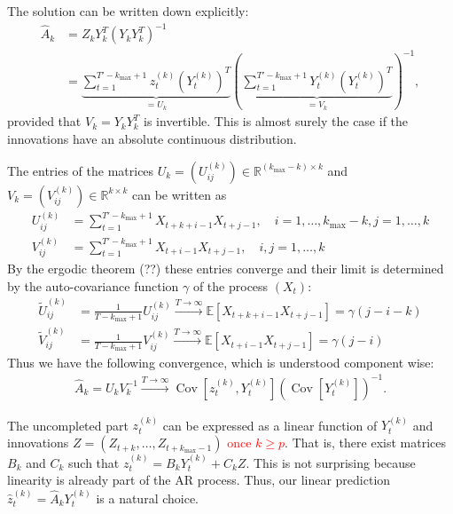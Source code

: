 The solution can be written down explicitly:
\begin{align*}
    \hat{A}_k&=Z_kY_k^{T}\left(Y_kY_k^{T}\right)^{-1}\\&
    =\underbrace{\sum_{t=1}^{T'-k_{\max}+1}z_t^{(k)}\left(Y_t^{(k)}\right)^T}_{=U_k}\left(\underbrace{\sum_{t=1}^{T'-k_{\max}+1}Y_t^{(k)}\left(Y_t^{(k)}\right)^{T}}_{=V_k}\right)^{-1},
\end{align*}
provided that $V_k=Y_kY_k^{T}$ is invertible. This is almost surely the case if the innovations have an absolute continuous distribution.


The entries of the matrices $U_k=(U_{ij}^{(k)})\in\mathbb{R}^{(k_{\max}-k)\times k}$ and $V_k=(V_{ij}^{(k)})\in\mathbb{R}^{k\times k}$ can be written as
\begin{align*}
    U_{ij}^{(k)}&=\sum_{t=1}^{T'-k_{\max}+1}X_{t+k+i-1}X_{t+j-1},\quad i=1,\dots,k_{\max}-k,j=1,\dots,k\\
    V_{ij}^{(k)}&=\sum_{t=1}^{T'-k_{\max}+1}X_{t+i-1}X_{t+j-1},\quad i,j=1,\dots,k
\end{align*}
By the ergodic theorem (??) these entries converge and their limit is determined by the auto-covariance function $\gamma$ of the process $(X_t)$:
\begin{align*}
    \tilde{U}_{ij}^{(k)}&=\frac{1}{T-k_{\max}+1}U_{ij}^{(k)}\stackrel{T\to\infty}{\to}\mathbb{E}\left[X_{t+k+i-1}X_{t+j-1}\right]=\gamma(j-i-k)\\
    \tilde{V}_{ij}^{(k)}&=\frac{1}{T-k_{\max}+1}V_{ij}^{(k)}\stackrel{T\to\infty}{\to}\mathbb{E}\left[X_{t+i-1}X_{t+j-1}\right]=\gamma(j-i)
\end{align*}
Thus we have the following convergence, which is understood component wise:
\begin{align*}
    \hat{A}_k=U_kV_k^{-1}\stackrel{T\to\infty}{\to}\operatorname{Cov}\left[z_t^{(k)},Y_t^{(k)}\right]\left(\operatorname{Cov}\left[Y_t^{(k)}\right]\right)^{-1}.
\end{align*}


The uncompleted part $z_t^{(k)}$ can be expressed as a linear function of $Y_t^{(k)}$ and innovations $Z=(Z_{t+k},\dots,Z_{t+k_{\max}-1})$ \textcolor{red}{once $k\ge p$}. That is, there exist matrices $B_k$ and $C_k$ such that $z_t^{(k)}=B_kY_t^{(k)}+C_kZ$. This is not surprising because linearity is already part of the AR process. Thus, our linear prediction $\hat{z}_t^{(k)}=\hat{A}_kY_t^{(k)}$ is a natural choice.

